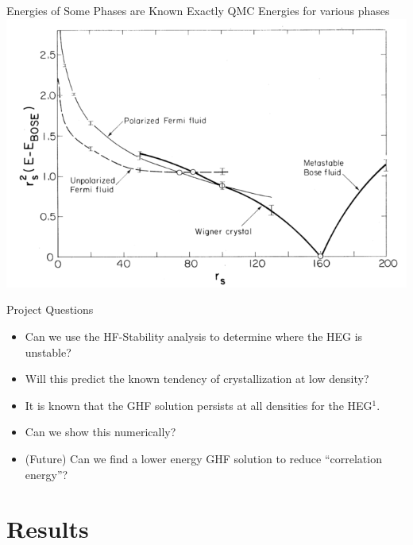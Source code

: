 \documentclass[10pt]{beamer}
\begin{document}
{{{{{{{%

\begin{frame}{Energies of Some Phases are Known Exactly}
  \centering
	QMC Energies for various phases
	\includegraphics[width=.85\linewidth]{../figures/Ceperley_PhaseDiag.png}
\end{frame}


{%
\begin{frame}{Project Questions}
	\begin{itemize}[<+->]
		\item{Can we use the HF-Stability analysis to determine where the HEG is unstable?}
		\item{Will this predict the known tendency of crystallization at low density?}
		\item{It is known that the GHF solution persists at all densities for the HEG$^1$.}
		\item{Can we show this numerically?}
		\item{(Future) Can we find a lower energy GHF solution to reduce ``correlation energy''?}
	\end{itemize}
\end{frame}



\section{Results}

{%

}}}}}}}}}
\end{document}
